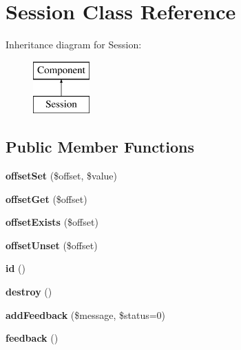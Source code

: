 \hypertarget{classSession}{
\section{Session Class Reference}
\label{classSession}
}
Inheritance diagram for Session:\begin{figure}[H]
\begin{center}
\leavevmode
\includegraphics[height=2.000000cm]{classSession}
\end{center}
\end{figure}
\subsection*{Public Member Functions}
\begin{DoxyCompactItemize}
\item 
\hypertarget{classSession_a71c2094d14dec32f7316332ce828ce9c}{
{\bfseries offsetSet} (\$offset, \$value)}
\label{classSession_a71c2094d14dec32f7316332ce828ce9c}

\item 
\hypertarget{classSession_add0611fb94dae2ef4f0c4ee42724a249}{
{\bfseries offsetGet} (\$offset)}
\label{classSession_add0611fb94dae2ef4f0c4ee42724a249}

\item 
\hypertarget{classSession_a984150b4571fcbe8501d3a980d49877a}{
{\bfseries offsetExists} (\$offset)}
\label{classSession_a984150b4571fcbe8501d3a980d49877a}

\item 
\hypertarget{classSession_a2f91fbb41ea4643fb6c83a64f2cfdc74}{
{\bfseries offsetUnset} (\$offset)}
\label{classSession_a2f91fbb41ea4643fb6c83a64f2cfdc74}

\item 
\hypertarget{classSession_a14e1fad994edf0ac73d617774c69dcfa}{
{\bfseries id} ()}
\label{classSession_a14e1fad994edf0ac73d617774c69dcfa}

\item 
\hypertarget{classSession_aaaeaf924cc8f951ae2adf7e182604b3f}{
{\bfseries destroy} ()}
\label{classSession_aaaeaf924cc8f951ae2adf7e182604b3f}

\item 
\hypertarget{classSession_a25b59d4868b28f083630a3d753c11f84}{
{\bfseries addFeedback} (\$message, \$status=0)}
\label{classSession_a25b59d4868b28f083630a3d753c11f84}

\item 
\hypertarget{classSession_ab71f5250f5f910d169ed61643d38fd2c}{
{\bfseries feedback} ()}
\label{classSession_ab71f5250f5f910d169ed61643d38fd2c}

\end{DoxyCompactItemize}
